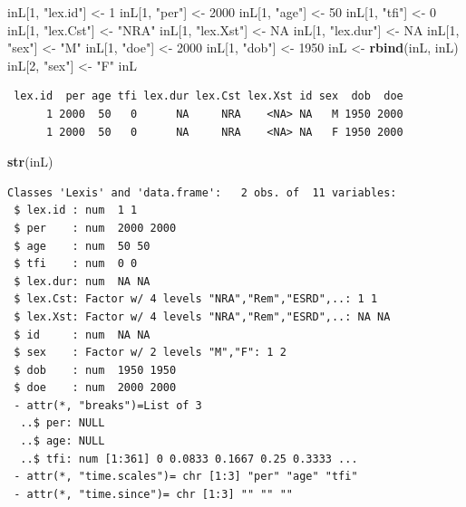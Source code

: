 \documentclass[
]{book}
\newenvironment{Shaded}{\begin{snugshade}}{\end{snugshade}}
\newcommand{\ConstantTok}[1]{\textcolor[rgb]{0.56,0.35,0.01}{#1}}
\newcommand{\DecValTok}[1]{\textcolor[rgb]{0.00,0.00,0.81}{#1}}
\newcommand{\FunctionTok}[1]{\textcolor[rgb]{0.13,0.29,0.53}{\textbf{#1}}}
\newcommand{\NormalTok}[1]{#1}
\newcommand{\OtherTok}[1]{\textcolor[rgb]{0.56,0.35,0.01}{#1}}
\newcommand{\StringTok}[1]{\textcolor[rgb]{0.31,0.60,0.02}{#1}}
\begin{document}
\begin{enumerate}
\begin{Shaded}
\begin{Highlighting}[]
\NormalTok{inL[}\DecValTok{1}\NormalTok{, }\StringTok{"lex.id"}\NormalTok{] }\OtherTok{\textless{}{-}} \DecValTok{1}
\NormalTok{inL[}\DecValTok{1}\NormalTok{, }\StringTok{"per"}\NormalTok{] }\OtherTok{\textless{}{-}} \DecValTok{2000}
\NormalTok{inL[}\DecValTok{1}\NormalTok{, }\StringTok{"age"}\NormalTok{] }\OtherTok{\textless{}{-}} \DecValTok{50}
\NormalTok{inL[}\DecValTok{1}\NormalTok{, }\StringTok{"tfi"}\NormalTok{] }\OtherTok{\textless{}{-}} \DecValTok{0}
\NormalTok{inL[}\DecValTok{1}\NormalTok{, }\StringTok{"lex.Cst"}\NormalTok{] }\OtherTok{\textless{}{-}} \StringTok{"NRA"}
\NormalTok{inL[}\DecValTok{1}\NormalTok{, }\StringTok{"lex.Xst"}\NormalTok{] }\OtherTok{\textless{}{-}} \ConstantTok{NA}
\NormalTok{inL[}\DecValTok{1}\NormalTok{, }\StringTok{"lex.dur"}\NormalTok{] }\OtherTok{\textless{}{-}} \ConstantTok{NA}
\NormalTok{inL[}\DecValTok{1}\NormalTok{, }\StringTok{"sex"}\NormalTok{] }\OtherTok{\textless{}{-}} \StringTok{"M"}
\NormalTok{inL[}\DecValTok{1}\NormalTok{, }\StringTok{"doe"}\NormalTok{] }\OtherTok{\textless{}{-}} \DecValTok{2000}
\NormalTok{inL[}\DecValTok{1}\NormalTok{, }\StringTok{"dob"}\NormalTok{] }\OtherTok{\textless{}{-}} \DecValTok{1950}
\NormalTok{inL }\OtherTok{\textless{}{-}} \FunctionTok{rbind}\NormalTok{(inL, inL)}
\NormalTok{inL[}\DecValTok{2}\NormalTok{, }\StringTok{"sex"}\NormalTok{] }\OtherTok{\textless{}{-}} \StringTok{"F"}
\NormalTok{inL}
\end{Highlighting}
\end{Shaded}

\begin{verbatim}
 lex.id  per age tfi lex.dur lex.Cst lex.Xst id sex  dob  doe
      1 2000  50   0      NA     NRA    <NA> NA   M 1950 2000
      1 2000  50   0      NA     NRA    <NA> NA   F 1950 2000
\end{verbatim}

\begin{Shaded}
\begin{Highlighting}[]
\FunctionTok{str}\NormalTok{(inL)}
\end{Highlighting}
\end{Shaded}

\begin{verbatim}
Classes 'Lexis' and 'data.frame':   2 obs. of  11 variables:
 $ lex.id : num  1 1
 $ per    : num  2000 2000
 $ age    : num  50 50
 $ tfi    : num  0 0
 $ lex.dur: num  NA NA
 $ lex.Cst: Factor w/ 4 levels "NRA","Rem","ESRD",..: 1 1
 $ lex.Xst: Factor w/ 4 levels "NRA","Rem","ESRD",..: NA NA
 $ id     : num  NA NA
 $ sex    : Factor w/ 2 levels "M","F": 1 2
 $ dob    : num  1950 1950
 $ doe    : num  2000 2000
 - attr(*, "breaks")=List of 3
  ..$ per: NULL
  ..$ age: NULL
  ..$ tfi: num [1:361] 0 0.0833 0.1667 0.25 0.3333 ...
 - attr(*, "time.scales")= chr [1:3] "per" "age" "tfi"
 - attr(*, "time.since")= chr [1:3] "" "" ""
\end{verbatim}


\end{enumerate}
\end{document}
